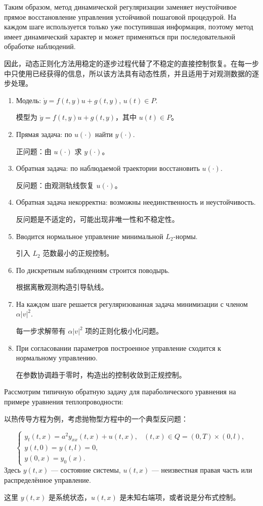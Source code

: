 \documentclass[12pt,a4paper]{article}
\newcommand{\plainheading}[2]{\par\bigskip\noindent{\large #1}\par\noindent{\large #2}\par\medskip}
\newcommand{\zh}[1]{\par\noindent #1\par}
\begin{document}
Таким образом, метод динамической регуляризации заменяет неустойчивое прямое восстановление управления устойчивой пошаговой процедурой. На каждом шаге используется только уже поступившая информация, поэтому метод имеет динамический характер и может применяться при последовательной обработке наблюдений.
\zh{因此，动态正则化方法用稳定的逐步过程代替了不稳定的直接控制恢复。在每一步中只使用已经获得的信息，所以该方法具有动态性质，并且适用于对观测数据的逐步处理。}

\plainheading{Краткая версия для запоминания}{记忆版要点}

\begin{enumerate}
    \item Модель: $\dot y=f(t,y)u+g(t,y)$, $u(t)\in P$.
    \zh{模型为 $\dot y=f(t,y)u+g(t,y)$，其中 $u(t)\in P$。}
    \item Прямая задача: по $u(\cdot)$ найти $y(\cdot)$.
    \zh{正问题：由 $u(\cdot)$ 求 $y(\cdot)$。}
    \item Обратная задача: по наблюдаемой траектории восстановить $u(\cdot)$.
    \zh{反问题：由观测轨线恢复 $u(\cdot)$。}
    \item Обратная задача некорректна: возможны неединственность и неустойчивость.
    \zh{反问题是不适定的，可能出现非唯一性和不稳定性。}
    \item Вводится нормальное управление минимальной $L_2$-нормы.
    \zh{引入 $L_2$ 范数最小的正规控制。}
    \item По дискретным наблюдениям строится поводырь.
    \zh{根据离散观测构造引导轨线。}
    \item На каждом шаге решается регуляризованная задача минимизации с членом $\alpha |v|^2$.
    \zh{每一步求解带有 $\alpha |v|^2$ 项的正则化极小化问题。}
    \item При согласовании параметров построенное управление сходится к нормальному управлению.
    \zh{在参数协调趋于零时，构造出的控制收敛到正规控制。}
\end{enumerate}



Рассмотрим типичную обратную задачу для параболического уравнения на примере уравнения теплопроводности:
\zh{以热传导方程为例，考虑抛物型方程中的一个典型反问题：}
\begin{equation}
\begin{cases}
    y_t(t,x)=a^2y_{xx}(t,x)+u(t,x), &(t,x)\in Q=(0,T)\times(0,l),\\
    y(t,0)=y(t,l)=0,\\
    y(0,x)=y_0(x).
\end{cases}
\end{equation}
Здесь $y(t,x)$ --- состояние системы, $u(t,x)$ --- неизвестная правая часть или распределённое управление.
\zh{这里 $y(t,x)$ 是系统状态，$u(t,x)$ 是未知右端项，或者说是分布式控制。}
\end{document}
